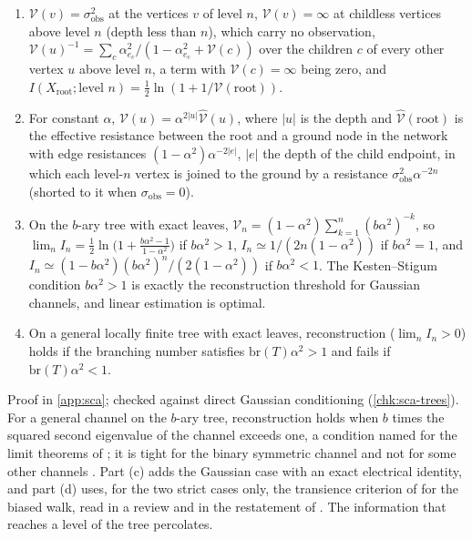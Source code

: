 \begin{theorem}\label{thm:sca-trees}
\begin{enumerate}
\item[(a)] $\mathcal V(v)=\sigma_{\mathrm{obs}}^2$ at the vertices $v$ of level $n$, $\mathcal V(v)=\infty$ at childless vertices above level $n$ (depth less than $n$), which carry no observation, $\mathcal V(u)^{-1}=\sum_c\alpha_{e_c}^2/(1-\alpha_{e_c}^2+\mathcal V(c))$ over the children $c$ of every other vertex $u$ above level $n$, a term with $\mathcal V(c)=\infty$ being zero, and $I(X_{\mathrm{root}};\text{level }n)=\tfrac12\ln(1+1/\mathcal V(\mathrm{root}))$.
\item[(b)] For constant $\alpha$, $\mathcal V(u)=\alpha^{2|u|}\hat{\mathcal V}(u)$, where $|u|$ is the depth and $\hat{\mathcal V}(\mathrm{root})$ is the effective resistance between the root and a ground node in the network with edge resistances $(1-\alpha^2)\alpha^{-2|e|}$, $|e|$ the depth of the child endpoint, in which each level-$n$ vertex is joined to the ground by a resistance $\sigma_{\mathrm{obs}}^2\alpha^{-2n}$ (shorted to it when $\sigma_{\mathrm{obs}}=0$).
\item[(c)] On the $b$-ary tree with exact leaves, $\mathcal V_n=(1-\alpha^2)\sum_{k=1}^n(b\alpha^2)^{-k}$, so $\lim_nI_n=\tfrac12\ln\bigl(1+\tfrac{b\alpha^2-1}{1-\alpha^2}\bigr)$ if $b\alpha^2>1$, $I_n\simeq1/(2n(1-\alpha^2))$ if $b\alpha^2=1$, and $I_n\simeq(1-b\alpha^2)(b\alpha^2)^n/(2(1-\alpha^2))$ if $b\alpha^2<1$. The Kesten--Stigum condition $b\alpha^2>1$ is exactly the reconstruction threshold for Gaussian channels, and linear estimation is optimal.
\item[(d)] On a general locally finite tree with exact leaves, reconstruction ($\lim_nI_n>0$) holds if the branching number satisfies $\mathrm{br}(T)\alpha^2>1$ and fails if $\mathrm{br}(T)\alpha^2<1$.
\end{enumerate}
\end{theorem}
Proof in \cref{app:sca}; checked against direct Gaussian conditioning (\cref{chk:sca-trees}). For a general channel on the $b$-ary tree, reconstruction holds when $b$ times the squared second eigenvalue of the channel exceeds one, a condition named for the limit theorems of \citet{kesten1966additional}; it is tight for the binary symmetric channel \citep{bleher1995purity,evans2000broadcasting} and not for some other channels \citep{mossel2001reconstruction}. Part (c) adds the Gaussian case with an exact electrical identity, and part (d) uses, for the two strict cases only, the transience criterion of \citet{lyons1990random} for the biased walk, read in a review and in the restatement of \citet{lyons1992random}. The information that reaches a level of the tree percolates.

